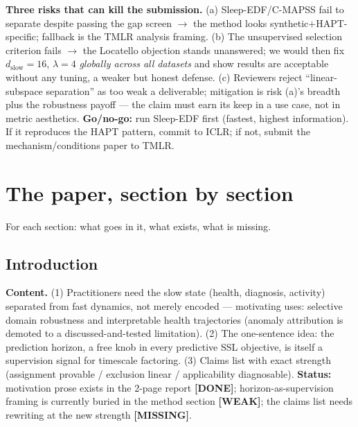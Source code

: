 \documentclass[10pt]{article}
\newcommand{\done}{\textcolor[rgb]{0,0.45,0}{\textbf{[DONE]}}}
\newcommand{\weak}{\textcolor[rgb]{0.8,0.5,0}{\textbf{[WEAK]}}}
\newcommand{\todo}{\textcolor[rgb]{0.75,0,0}{\textbf{[MISSING]}}}
\begin{document}
\textbf{Three risks that can kill the submission.} (a) Sleep-EDF/C-MAPSS
fail to separate despite passing the gap screen $\to$ the method looks
synthetic$+$HAPT-specific; fallback is the TMLR analysis framing. (b) The
unsupervised selection criterion fails $\to$ the Locatello objection stands
unanswered; we would then fix $d_{\mathrm{slow}}{=}16$, $\lambda{=}4$
\emph{globally across all datasets} and show results are acceptable without
any tuning, a weaker but honest defense. (c) Reviewers reject
``linear-subspace separation'' as too weak a deliverable; mitigation is risk
(a)'s breadth plus the robustness payoff --- the claim must earn its keep in
a use case, not in metric aesthetics. \textbf{Go/no-go:} run Sleep-EDF first
(fastest, highest information). If it reproduces the HAPT pattern, commit to
ICLR; if not, submit the mechanism/conditions paper to TMLR.

\section{The paper, section by section}
\label{sec:paper}
For each section: what goes in it, what exists, what is missing.

\subsection{Introduction}
\textbf{Content.} (1) Practitioners need the slow state (health, diagnosis,
activity) separated from fast dynamics, not merely encoded --- motivating
uses: selective domain robustness and interpretable health trajectories
(anomaly attribution is demoted to a discussed-and-tested limitation).
(2) The one-sentence idea: the prediction horizon, a free knob in every
predictive SSL objective, is itself a supervision signal for
timescale factoring. (3) Claims list with exact strength (assignment
provable / exclusion linear / applicability diagnosable).
\textbf{Status:} motivation prose exists in the 2-page report \done;
horizon-as-supervision framing is currently buried in the method section
\weak; the claims list needs rewriting at the new strength \todo.
\end{document}
